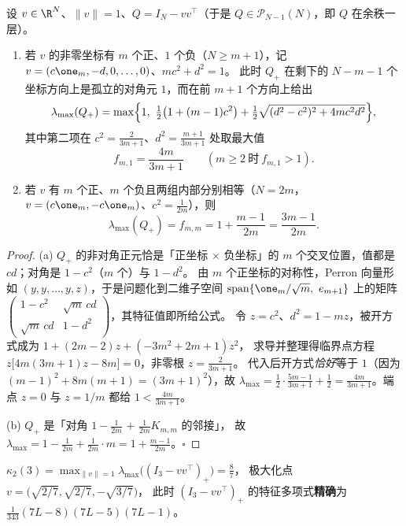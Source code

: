 \begin{proposition}[余秩一层的闭式，已证]\label{prop:corank1}
设 $v\in\R^N$、$\|v\|=1$、$Q=I_N-vv^\top$（于是 $Q\in\mathcal P_{N-1}(N)$，即 $Q$ 在余秩一层）。
\begin{enumerate}[label=(\alph*),leftmargin=2.2em]
\item 若 $v$ 的非零坐标有 $m$ 个正、$1$ 个负（$N\ge m+1$），记 $v=(c\one_m,-d,0,\dots,0)$、$mc^2+d^2=1$。
此时 $Q_+$ 在剩下的 $N-m-1$ 个坐标方向上是孤立的对角元 $1$，而在前 $m+1$ 个方向上给出
\[
\lambda_{\max}(Q_+)=\max\Bigl\{1,\ \tfrac12\bigl(1+(m-1)c^2\bigr)+\tfrac12\sqrt{(d^2-c^2)^2+4mc^2d^2}\Bigr\},
\]
其中第二项在 $c^2=\frac2{3m+1}$、$d^2=\frac{m+1}{3m+1}$ 处取最大值
\begin{equation}\label{eq:fm1}
f_{m,1}=\frac{4m}{3m+1}\qquad(m\ge2\ \text{时}\ f_{m,1}>1).
\end{equation}
\item 若 $v$ 有 $m$ 个正、$m$ 个负且两组内部分别相等（$N=2m$，$v=(c\one_m,-c\one_m)$、$c^2=\frac1{2m}$），则
\begin{equation}\label{eq:fmm}
\lambda_{\max}(Q_+)=f_{m,m}=1+\frac{m-1}{2m}=\frac{3m-1}{2m}.
\end{equation}
\end{enumerate}
\end{proposition}

\begin{proof}
(a) $Q_+$ 的非对角正元恰是「正坐标 $\times$ 负坐标」的 $m$ 个交叉位置，值都是 $cd$；对角是 $1-c^2$（$m$ 个）与 $1-d^2$。
由 $m$ 个正坐标的对称性，Perron 向量形如 $(y,y,\dots,y,z)$，于是问题化到二维子空间
$\mathrm{span}\{\one_m/\sqrt m,\ e_{m+1}\}$ 上的矩阵
$\begin{pmatrix}1-c^2&\sqrt m\,cd\\ \sqrt m\,cd&1-d^2\end{pmatrix}$，其特征值即所给公式。
令 $z=c^2$、$d^2=1-mz$，被开方式成为 $1+(2m-2)z+(-3m^2+2m+1)z^2$，
求导并整理得临界点方程 $z\bigl[4m(3m+1)z-8m\bigr]=0$，非零根 $z=\frac2{3m+1}$。
代入后开方式\emph{恰好}等于 $1$（因为 $(m-1)^2+8m(m+1)=(3m+1)^2$），故
$\lambda_{\max}=\frac12\cdot\frac{5m-1}{3m+1}+\frac12=\frac{4m}{3m+1}$。端点 $z=0$ 与 $z=1/m$ 都给 $1<\frac{4m}{3m+1}$。

(b) $Q_+$ 是「对角 $1-\frac1{2m}$ $+$ $\frac1{2m}K_{m,m}$ 的邻接」，
故 $\lambda_{\max}=1-\frac1{2m}+\frac1{2m}\cdot m=1+\frac{m-1}{2m}$。$\square$
\end{proof}

\begin{corollary}[$\kappa_2(3)=\frac87$，已证]\label{cor:k23}
$\kappa_2(3)=\max_{\|v\|=1}\lambda_{\max}\bigl((I_3-vv^\top)_+\bigr)=\frac87$，
极大化点 $v=\bigl(\sqrt{2/7},\sqrt{2/7},-\sqrt{3/7}\bigr)$，
此时 $(I_3-vv^\top)_+$ 的特征多项式\textbf{精确}为 $\frac1{343}(7L-8)(7L-5)(7L-1)$。
\end{corollary}

